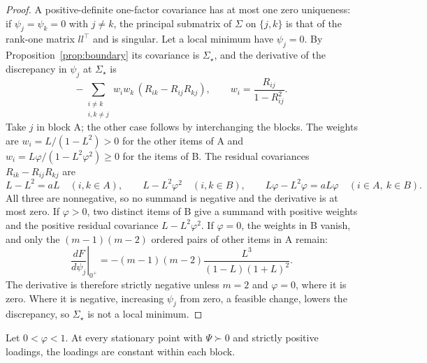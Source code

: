 \begin{proof}
A positive-definite one-factor covariance has at most one zero uniqueness: if $\psi_j=\psi_k=0$ with $j\ne k$, the principal submatrix of $\Sigma$ on $\{j,k\}$ is that of the rank-one matrix $ll^{\top}$ and is singular. Let a local minimum have $\psi_j=0$. By Proposition~\ref{prop:boundary} its covariance is $\Sigma_\star$, and the derivative of the discrepancy in $\psi_j$ at $\Sigma_\star$ is
\[
-\sum_{\substack{i\ne k\\i,k\ne j}}w_iw_k\,(R_{ik}-R_{ij}R_{kj}),
\qquad w_i=\frac{R_{ij}}{1-R_{ij}^2}.
\]
Take $j$ in block A; the other case follows by interchanging the blocks. The weights are $w_i=L/(1-L^2)>0$ for the other items of A and $w_i=L\varphi/(1-L^2\varphi^2)\ge0$ for the items of B. The residual covariances $R_{ik}-R_{ij}R_{kj}$ are
\[
L-L^2=aL\quad(i,k\in A),\qquad
L-L^2\varphi^2\quad(i,k\in B),\qquad
L\varphi-L^2\varphi=aL\varphi\quad(i\in A,\ k\in B).
\]
All three are nonnegative, so no summand is negative and the derivative is at most zero. If $\varphi>0$, two distinct items of B give a summand with positive weights and the positive residual covariance $L-L^2\varphi^2$. If $\varphi=0$, the weights in B vanish, and only the $(m-1)(m-2)$ ordered pairs of other items in A remain:
\[
\left.\frac{dF}{d\psi_j}\right|_{0^+}
=-(m-1)(m-2)\frac{L^3}{(1-L)(1+L)^2}.
\]
The derivative is therefore strictly negative unless $m=2$ and $\varphi=0$, where it is zero. Where it is negative, increasing $\psi_j$ from zero, a feasible change, lowers the discrepancy, so $\Sigma_\star$ is not a local minimum.
\end{proof}

\begin{applemma}
\label{lem:A-uniformity}
Let $0<\varphi<1$. At every stationary point with $\Psi\succ0$ and strictly positive loadings, the loadings are constant within each block.
\end{applemma}

